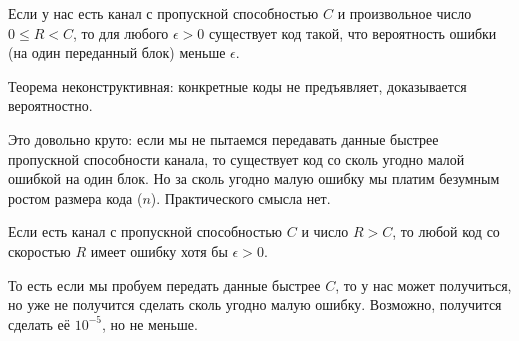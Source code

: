 \begin{theorem}
	Если у нас есть канал с пропускной способностью $C$ и произвольное число $0 \le R < C$,
	то для любого $\epsilon > 0$ существует код такой, что
	вероятность ошибки (на один переданный блок) меньше $\epsilon$.
\end{theorem}
\begin{Rem}
	Теорема неконструктивная: конкретные коды не предъявляет, доказывается вероятностно.
\end{Rem}
\begin{Rem}
	Это довольно круто: если мы не пытаемся передавать данные быстрее пропускной способности канала,
	то существует код со сколь угодно малой ошибкой на один блок.
	Но за сколь угодно малую ошибку мы платим безумным ростом размера кода ($n$).
	Практического смысла нет.
\end{Rem}
\begin{theorem}
	Если есть канал с пропускной способностью $C$ и число $R>C$,
	то любой код со скоростью $R$ имеет ошибку хотя бы $\epsilon >0 $.
\end{theorem}
\begin{Rem}
	То есть если мы пробуем передать данные быстрее $C$, то у нас может получиться,
	но уже не получится сделать сколь угодно малую ошибку.
	Возможно, получится сделать её $10^{-5}$, но не меньше.
\end{Rem}
